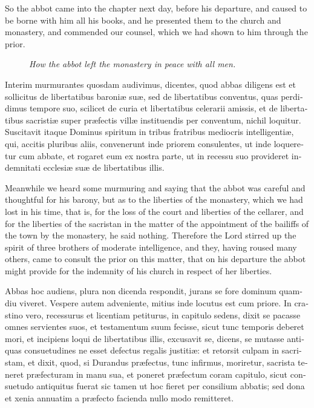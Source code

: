 \documentclass[10pt]{book}
\newcommand{\blockhead}[4][]{
\begin{figure}
\centering
\vspace{#4}
\parbox{2.75cm}{\begin{center}\footnotesize \color{BrickRed} \emph{#2}\\ #1 \end{center}}
\end{figure}
}
\begin{document}
\begin{paracol}{2}
\switchcolumn

So the abbot came into the chapter next day, before his departure, and caused to be borne with him all his books, and he presented them to the church and monastery, and commended our counsel, which we had shown to him through the prior.

\switchcolumn*

\begin{otherlanguage}{latin}
\blockhead{How the abbot left the monastery in peace with all men.}{4}{-.45cm}
Interim murmurantes quosdam audivimus, dicentes, quod abbas diligens est et sollicitus de libertatibus baroni\ae{} su\ae{}, sed de libertatibus conventus, quas perdidimus tempore suo, scilicet de curia et libertatibus celerarii amissis, et de libertatibus sacristi\ae{} super pr\ae{}fectis vill\ae{} instituendis per conventum, nichil loquitur. Suscitavit itaque Dominus spiritum in tribus fratribus mediocris intelligenti\ae{}, qui, accitis pluribus aliis, convenerunt inde priorem consulentes, ut inde loqueretur cum abbate, et rogaret eum ex nostra parte, ut in recessu suo provideret indemnitati ecclesi\ae{} su\ae{} de libertatibus illis. 

\end{otherlanguage}

\switchcolumn

Meanwhile we heard some murmuring and saying that the abbot was careful and thoughtful for his barony, but as to the liberties of the monastery, which we had lost in his time, that is, for the loss of the court and liberties of the cellarer, and for the liberties of the sacristan in the matter of the appointment of the bailiffs of the town by the monastery, he said nothing. Therefore the Lord stirred up the spirit of three brothers of moderate intelligence, and they, having roused many others, came to consult the prior on this matter, that on his departure the abbot might provide for the indemnity of his church in respect of her liberties.

\switchcolumn*

\begin{otherlanguage}{latin}
Abbas hoc audiens, plura non dicenda respondit, jurans se fore dominum quamdiu viveret. Vespere autem adveniente, mitius inde locutus est cum priore. In crastino vero, recessurus et licentiam petiturus, in capitulo sedens, dixit se pacasse omnes servientes suos, et testamentum suum fecisse, sicut tunc temporis deberet mori, et incipiens loqui de libertatibus illis, excusavit se, dicens, se mutasse antiquas consuetudines ne esset defectus regalis justiti\ae{}: et retorsit culpam in sacristam, et dixit, quod, si Durandus pr\ae{}fectus, tunc infirmus, moriretur, sacrista teneret pr\ae{}fecturam in manu sua, et poneret pr\ae{}fectum coram capitulo, sicut consuetudo antiquitus fuerat sic tamen ut hoc fieret per consilium abbatis; sed dona et xenia annuatim a pr\ae{}fecto facienda nullo modo remitteret.
\end{otherlanguage}


\end{paracol}
\end{document}
